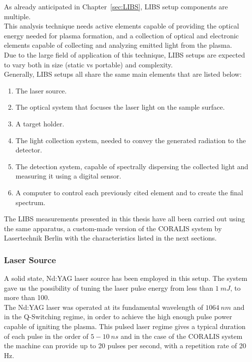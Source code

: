As already anticipated in Chapter~\ref{sec:LIBS}, LIBS setup components are multiple.
\\
This analysis technique needs active elements capable of providing the optical energy needed for plasma formation, and a collection of optical and electronic elements capable of collecting and analyzing emitted light from the plasma.
\\
Due to the large field of application of this technique, LIBS setups are expected to vary both in size (static vs portable) and complexity.
\\
Generally, LIBS setups all share the same main elements that are listed below:
\begin{enumerate}
    \item The laser source.
    \item The optical system that focuses the laser light on the sample surface.
    \item A target holder.
    \item The light collection system, needed to convey the generated radiation to the detector.
    \item The detection system, capable of spectrally dispersing the collected light and measuring it using a digital sensor.
    \item A computer to control each previously cited element and to create the final spectrum.
\end{enumerate}
The LIBS measurements presented in this thesis have all been carried out using the same apparatus, a custom-made version of the CORALIS system by Lasertechnik Berlin \cite{LTBLasertechnikBerlin} with the characteristics listed in the next sections.

\subsubsection{Laser Source}
\label{subsubsec:laster_source}
A solid state, Nd:YAG laser source has been employed in this setup. The system gave us the possibility of tuning the laser pulse energy from less than $1 \: mJ$,  to more than 100.
\\
The Nd:YAG laser was operated at its fundamental wavelength of $1064 \: nm$ and in the Q-Switching regime, in order to achieve the high enough pulse power capable of igniting the plasma. This pulsed laser regime gives a typical duration of each pulse in the order of $5-10\: ns$ and in the case of the CORALIS system the machine can provide up to 20 pulses per second, with a repetition rate of 20 Hz.

